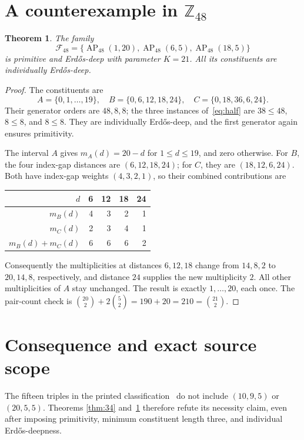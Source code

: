 \documentclass[11pt]{article}
\newtheorem{theorem}{Theorem}
\newcommand{\Z}{\mathbb Z}
\newcommand{\AP}{\operatorname{AP}}
\begin{document}
\newpage
\section{A counterexample in $\Z_{48}$}
\begin{theorem}\label{thm:48}
The family
\[
 \mathcal F_{48}=\{\AP_{48}(1,20),\AP_{48}(6,5),\AP_{48}(18,5)\}
\]
is primitive and Erd\H{o}s-deep with parameter $K=21$.
All its constituents are individually Erd\H{o}s-deep.
\end{theorem}
\begin{proof}
The constituents are
\[
 A=\{0,1,\ldots,19\},\quad
 B=\{0,6,12,18,24\},\quad C=\{0,18,36,6,24\}.
\]
Their generator orders are $48,8,8$; the three instances
of~\eqref{eq:half} are $38\le48$, $8\le8$, and $8\le8$.
They are individually Erd\H{o}s-deep, and the first generator again
ensures primitivity.

The interval $A$ gives $m_A(d)=20-d$ for $1\le d\le19$, and zero
otherwise. For $B$, the four index-gap distances are $(6,12,18,24)$;
for $C$, they are $(18,12,6,24)$. Both have index-gap weights
$(4,3,2,1)$, so their combined contributions are
\begin{center}
\begin{tabular}{rrrrr}
\toprule
$d$ & 6&12&18&24\\
\midrule
$m_B(d)$&4&3&2&1\\
$m_C(d)$&2&3&4&1\\
$m_B(d)+m_C(d)$&6&6&6&2\\
\bottomrule
\end{tabular}
\end{center}
Consequently the multiplicities at distances $6,12,18$ change from
$14,8,2$ to $20,14,8$, respectively, and distance $24$ supplies the
new multiplicity $2$. All other multiplicities of $A$ stay unchanged.
The result is exactly $1,\ldots,20$, each once. The pair-count check is
$\binom{20}{2}+2\binom52=190+20=210=\binom{21}{2}$.
\end{proof}

\section{Consequence and exact source scope}
The fifteen triples in the printed classification~\cite[Conjecture~1,
p.~14]{DG} do not include $(10,9,5)$ or $(20,5,5)$. Theorems
\ref{thm:34} and~\ref{thm:48} therefore refute its necessity claim,
even after imposing primitivity, minimum constituent length three,
and individual Erd\H{o}s-deepness.
\end{document}
